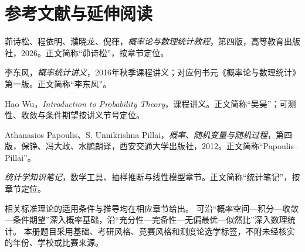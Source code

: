 \chapter{参考文献与延伸阅读}
\begin{enumerate}[label={[\arabic*]}]
\item 茆诗松、程依明、濮晓龙、倪葎，\textit{概率论与数理统计教程}，第四版，高等教育出版社，2026。正文简称“茆诗松”，按章节定位。
\item 李东风，\textit{概率统计讲义}，2016年秋季课程讲义；对应何书元《概率论与数理统计》第一版。正文简称“李东风”。
\item Hao Wu，\textit{Introduction to Probability Theory}，课程讲义。正文简称“吴昊”；可测性、收敛与条件期望按讲义节号定位。
\item Athanasios Papoulis、S. Unnikrishna Pillai，\textit{概率、随机变量与随机过程}，第四版，保铮、冯大政、水鹏朗译，西安交通大学出版社，2012。正文简称“Papoulis--Pillai”。
\item \textit{统计学知识笔记}，数学工具、抽样推断与线性模型章节。正文简称“统计笔记”，按章节定位。
\end{enumerate}
相关标准理论的适用条件与推导均在相应章节给出。
可沿“概率空间—积分—收敛—条件期望”深入概率基础，沿“充分性—完备性—无偏最优—似然比”深入数理统计。
本册题目采用基础、考研风格、竞赛风格和测度论选学标签，不附未经核实的年份、学校或比赛来源。
